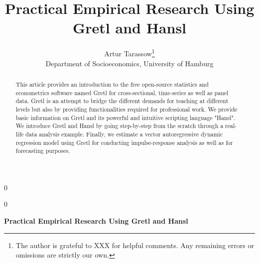\documentclass[11pt]{article}
\newcommand{\blind}{0}
\begin{document}
%

\def\spacingset#1{\renewcommand{\baselinestretch}%
	{#1}\small\normalsize} \spacingset{1}



\blind
{
	\title{\bf Practical Empirical Research Using Gretl and Hansl}
	\author{Artur Tarassow\thanks{
			The author is grateful to XXX for helpful comments. Any remaining errors or omissions are strictly our own.}\hspace{.2cm}\\
		Department of Socioeconomics, University of Hamburg}
	\maketitle
} \fi

\blind
{
	\bigskip
	\bigskip
	\bigskip
	\begin{center}
		{\LARGE\bf Practical Empirical Research Using Gretl and Hansl}
	\end{center}
	\medskip
} \fi

\bigskip
\begin{abstract}
	This article provides an introduction to the free open-source statistics and econometrics software named Gretl for cross-sectional, time-series as well as panel data. Gretl is an attempt to bridge the different demands for teaching at different levels but also by providing functionalities required for professional work. We provide basic information on Gretl and its powerful and intuitive scripting language "Hansl". We introduce Gretl and Hansl by going step-by-step from the scratch through a real-life data analysis example. Finally, we estimate a vector autoregressive dynamic regression model using Gretl for conducting impulse-response analysis as well as for forecasting purposes.
\end{abstract}


\vfill

\newpage
\doublespacing

\newpage
\end{document}
